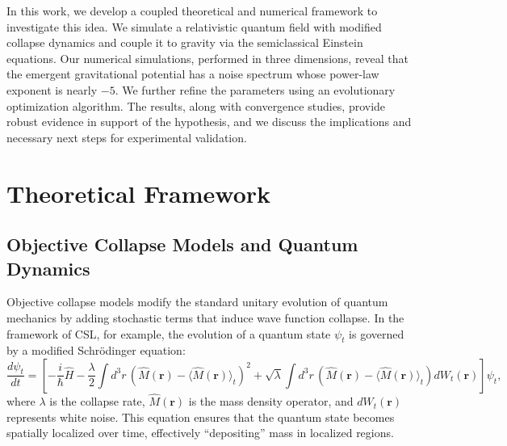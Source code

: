 \documentclass[11pt,a4paper]{article}
\begin{document}
In this work, we develop a coupled theoretical and numerical framework to investigate this idea. We simulate a relativistic quantum field with modified collapse dynamics and couple it to gravity via the semiclassical Einstein equations. Our numerical simulations, performed in three dimensions, reveal that the emergent gravitational potential has a noise spectrum whose power-law exponent is nearly $-5$. We further refine the parameters using an evolutionary optimization algorithm. The results, along with convergence studies, provide robust evidence in support of the hypothesis, and we discuss the implications and necessary next steps for experimental validation.

\section{Theoretical Framework}
\subsection{Objective Collapse Models and Quantum Dynamics}
Objective collapse models modify the standard unitary evolution of quantum mechanics by adding stochastic terms that induce wave function collapse. In the framework of CSL, for example, the evolution of a quantum state $\psi_t$ is governed by a modified Schrödinger equation:
\begin{equation} \label{eq:CSL}
\frac{d\psi_t}{dt} = \left[-\frac{i}{\hbar}\hat{H} - \frac{\lambda}{2}\int d^3r\, \left(\hat{M}(\mathbf{r}) - \langle \hat{M}(\mathbf{r}) \rangle_t\right)^2 + \sqrt{\lambda}\int d^3r\, \left(\hat{M}(\mathbf{r}) - \langle \hat{M}(\mathbf{r}) \rangle_t\right)dW_t(\mathbf{r})\right]\psi_t,
\end{equation}
where $\lambda$ is the collapse rate, $\hat{M}(\mathbf{r})$ is the mass density operator, and $dW_t(\mathbf{r})$ represents white noise. This equation ensures that the quantum state becomes spatially localized over time, effectively “depositing” mass in localized regions.
\end{document}
